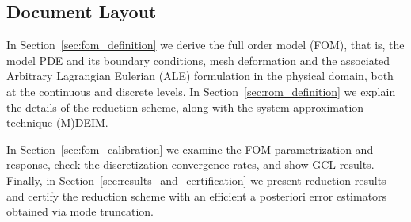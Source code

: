 \documentclass[thesis.tex]{subfiles}
\begin{document}
\subsection{Document Layout}
    In Section~\ref{sec:fom_definition} we derive the full order model (FOM), 
    that is, the model PDE and its boundary conditions, 
    mesh deformation and 
    the associated Arbitrary Lagrangian Eulerian (ALE) formulation
    in the physical domain,
    both at the continuous and discrete levels.
    In Section~\ref{sec:rom_definition} we explain the details of the reduction scheme, 
    along with the system approximation technique (M)DEIM.

    In Section~\ref{sec:fom_calibration} 
    we examine the FOM parametrization and response, 
    check the discretization convergence rates, and show GCL results.
    Finally, in Section~\ref{sec:results_and_certification} we present reduction results
    and certify the reduction scheme with an efficient a posteriori error estimators obtained via mode truncation.
\end{document}
